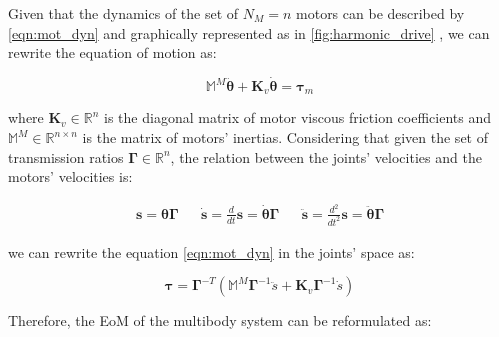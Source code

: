 Given that the dynamics of the set of $N _M = n$ motors can be described by \cref{eqn:mot_dyn} and graphically represented as in \cref{fig:harmonic_drive} \citep{folga2010}, we can rewrite the equation of motion as:

\begin{equation}
    \mathbb{M} ^M \ddot{\boldsymbol{\theta}} + \mathbf{K}_v \dot{\boldsymbol{\theta}} = \boldsymbol{\tau}_m
    \label{eqn:mot_dyn}
\end{equation}

where $\mathbf{K}_v \in \mathbb{R}^n$ is the diagonal matrix of motor viscous friction coefficients and $\mathbb{M}^M \in \mathbb{R}^{n \times n}$ is the matrix of motors' inertias. Considering that given the set of transmission ratios $\boldsymbol{\Gamma} \in \mathbb{R}^n$, the relation between the joints' velocities and the motors' velocities is:

\begin{align}
    \mathbf{s} = \boldsymbol{\theta} \boldsymbol{\Gamma} &  & \dot{\mathbf{s}} = \frac{d}{dt} \mathbf{s} = \dot{\boldsymbol{\theta}} \boldsymbol{\Gamma} &  & \ddot{\mathbf{s}} = \frac{d^2}{dt^2} \mathbf{s} = \ddot{\boldsymbol{\theta}} \boldsymbol{\Gamma}
\end{align}

we can rewrite the equation \cref{eqn:mot_dyn} in the joints' space as:

\begin{equation}
    \label{eqn:mot_dyn_jointspace}
    \boldsymbol{\tau} = \boldsymbol{\Gamma} ^{-T} (\mathbb{M} ^M\boldsymbol{\Gamma} ^{-1} \ddot{s} + \mathbf{K}_v \boldsymbol{\Gamma} ^{-1}\dot{s})
\end{equation}

Therefore, the \ac{EoM} of the multibody system can be reformulated as:


